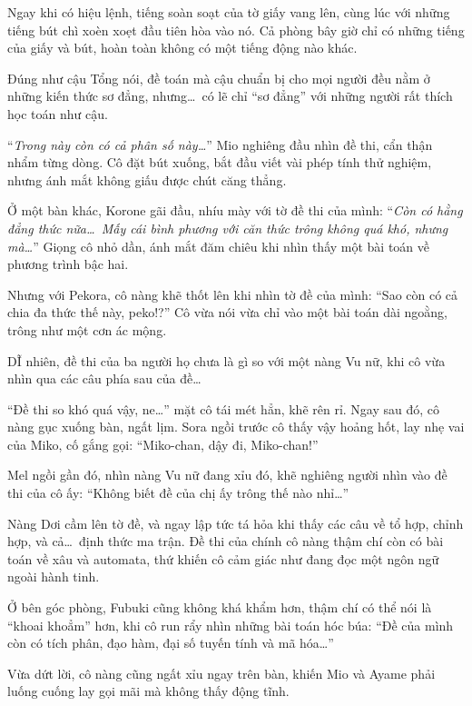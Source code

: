 \documentclass[../main.tex]{subfiles}
\begin{document}
Ngay khi có hiệu lệnh, tiếng soàn soạt của tờ giấy vang lên, cùng lúc với những tiếng bút chì xoèn xoẹt đầu tiên hòa vào nó. Cả phòng bây giờ chỉ có những tiếng của giấy và bút, hoàn toàn không có một tiếng động nào khác.

\ct

Đúng như cậu Tổng nói, đề toán mà cậu chuẩn bị cho mọi người đều nằm ở những kiến thức sơ đẳng, nhưng\dots\ có lẽ chỉ ``sơ đẳng'' với những người rất thích học toán như cậu.

``\textit{Trong này còn có cả phân số này\dots}'' Mio nghiêng đầu nhìn đề thi, cẩn thận nhẩm từng dòng. Cô đặt bút xuống, bắt đầu viết vài phép tính thử nghiệm, nhưng ánh mắt không giấu được chút căng thẳng.

Ở một bàn khác, Korone gãi đầu, nhíu mày với tờ đề thi của mình: ``\textit{Còn có hằng đẳng thức nữa\dots\ Mấy cái bình phương với căn thức trông không quá khó, nhưng mà\dots}'' Giọng cô nhỏ dần, ánh mắt đăm chiêu khi nhìn thấy một bài toán về phương trình bậc hai.

Nhưng với Pekora, cô nàng khẽ thốt lên khi nhìn tờ đề của mình: ``Sao còn có cả chia đa thức thế này, peko!?'' Cô vừa nói vừa chỉ vào một bài toán dài ngoằng, trông như một cơn ác mộng.

DĨ nhiên, đề thi của ba người họ chưa là gì so với một nàng Vu nữ, khi cô vừa nhìn qua các câu phía sau của đề\dots

``Đề thi so khó quá vậy, ne\dots'' mặt cô tái mét hẳn, khẽ rên rỉ. Ngay sau đó, cô nàng gục xuống bàn, ngất lịm. Sora ngồi trước cô thấy vậy hoảng hốt, lay nhẹ vai của Miko, cố gắng gọi: ``Miko-chan, dậy đi, Miko-chan!''

Mel ngồi gần đó, nhìn nàng Vu nữ đang xỉu đó, khẽ nghiêng người nhìn vào đề thi của cô ấy: ``Không biết đề của chị ấy trông thế nào nhỉ\dots''

Nàng Dơi cầm lên tờ đề, và ngay lập tức tá hỏa khi thấy các câu về tổ hợp, chỉnh hợp, và cả\dots\ định thức ma trận. Đề thi của chính cô nàng thậm chí còn có bài toán về xâu và automata, thứ khiến cô cảm giác như đang đọc một ngôn ngữ ngoài hành tinh.

Ở bên góc phòng, Fubuki cũng không khá khẩm hơn, thậm chí có thể nói là ``khoai khoẳm'' hơn, khi cô run rẩy nhìn những bài toán hóc búa: ``Đề của mình còn có tích phân, đạo hàm, đại số tuyến tính và mã hóa\dots''

Vừa dứt lời, cô nàng cũng ngất xỉu ngay trên bàn, khiến Mio và Ayame phải luống cuống lay gọi mãi mà không thấy động tĩnh.
\end{document}
